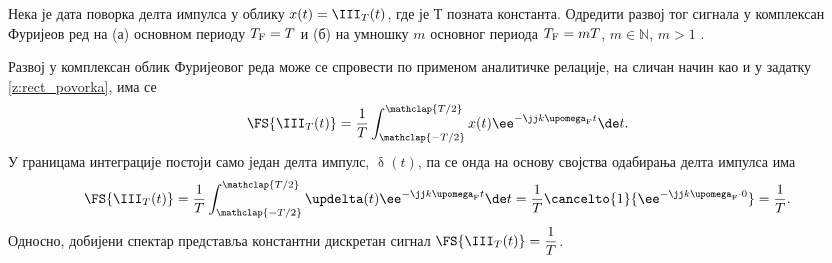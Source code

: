 \PID \label{z:dirak_povorka} \mnImportant
Нека је дата поворка делта импулса у облику $x(t) = \III_T(t)$, где је $Т$ позната константа. 
Одредити развој тог сигнала у комплексан Фуријеов ред 
на (а) основном периоду $T_{\rm F} = T$  и (б) на умношку $m$ основног периода $T_{\rm F} = mT$, $m \in \mathbb N$, $m > 1$ .

\RESENJE
Развој у комплексан облик Фуријеовог реда  може се спровести по применом аналитичке релације, на сличан начин као и у 
задатку \ref{z:rect_povorka}, има се 
\begin{eqnarray}
    \FS{\III_{T}(t)} = \dfrac{1}{T} 
    \int_{\mathclap{-T/2}}^{\mathclap{T/2}} x(t) \ee^{-\jj k \upomega_{\rm F} t} \de t. \label{\ID.e1}
\end{eqnarray}
У границама интеграције постоји само један делта импулс, $\updelta(t)$, па се онда на основу 
својства одабирања делта импулса има 
\begin{eqnarray}
    \FS{\III_{T}(t)} = \dfrac{1}{T} 
    \int_{\mathclap{-T/2}}^{\mathclap{T/2}} \updelta(t) \ee^{-\jj k \upomega_{\rm F} t} \de t = 
     \dfrac{1}{T} \cancelto{1}{\ee^{-\jj k \upomega_{\rm F} \cdot 0}} = \dfrac{1}{T}.
\end{eqnarray}
Односно, добијени спектар представља константни дискретан сигнал $\FS{\III_{T}(t)} = \dfrac{1}{T}$. 


